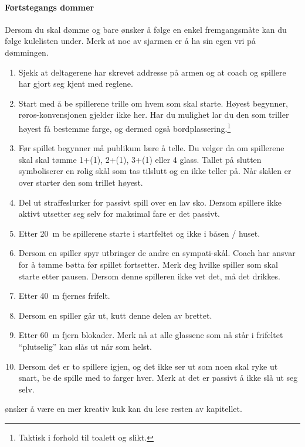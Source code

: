 \documentclass[10pt,a4paper,norsk,openany]{book}
\begin{document}
\paragraph{Førtstegangs dommer} Dersom du skal dømme og bare ønsker å følge en
enkel fremgangsmåte kan du følge kulelisten under. Merk at noe av sjarmen er å
ha sin egen vri på dømmingen.
%
\begin{enumerate}
    \item Sjekk at deltagerene har skrevet addresse på armen og at coach og
    spillere har gjort seg kjent med reglene.
    
    \item Start med å be spillerene trille om hvem som skal starte. Høyest
    begynner, røros-konvensjonen gjelder ikke her. Har du mulighet lar du den
    som triller høyest få bestemme farge, og dermed også
    bordplassering.\footnote{Taktisk i forhold til toalett og slikt.}
    
  \item Før spillet begynner må publikum lære å telle. Du velger da om
    spillerene skal skal tømme 1+(1), 2+(1), 3+(1) eller 4 glass. Tallet på
    slutten symboliserer en rolig skål som tas tilslutt og en ikke teller på.
    Når skålen er over starter den som trillet høyest.
    
  \item Del ut straffeslurker for passivt spill over en lav sko. Dersom spillere
    ikke aktivt utsetter seg selv for maksimal fare er det passivt.
    
  \item Etter \SI{20}{\m} be spillerene starte i startfeltet og ikke i båsen /
    huset.
    
  \item Dersom en spiller spyr utbringer de andre en sympati-skål. Coach har
    ansvar for å tømme bøtta før spillet fortsetter. Merk deg hvilke spiller som
    skal starte etter pausen. Dersom denne spilleren ikke vet det, må det
    drikkes.
    
  \item Etter \SI{40}{m} fjernes frifelt.
    
  \item Dersom en spiller går ut, kutt denne delen av brettet.
    
  \item Etter \SI{60}{m} fjern blokader. Merk nå at alle glassene som nå står i
    frifeltet ``plutselig'' kan slås ut når som helst.
    
  \item Dersom det er to spillere igjen, og det ikke ser ut som noen skal ryke
    ut snart, be de spille med to farger hver. Merk at det er passivt å ikke slå
    ut seg selv. 
\end{enumerate}
%
ønsker å være en mer kreativ kuk kan du lese resten av kapitellet. 
\end{document}
